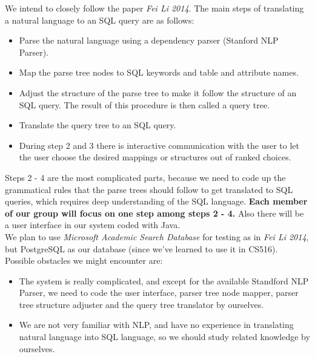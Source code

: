 \documentclass[twocolumn]{article}
\begin{document}
\begin{itemize}
	We intend to closely follow the paper \textit{Fei Li 2014}. The main steps of translating a natural language to an SQL query are as follows:\\
	\begin{itemize}
		\item Parse the natural language using a dependency parser (Stanford NLP Parser).\\
		\item Map the parse tree nodes to SQL keywords and table and attribute names.\\
		\item Adjust the structure of the parse tree to make it follow the structure of an SQL query. The result of this procedure is then called a query tree.\\
		\item Translate the query tree to an SQL query.\\
		\item During step 2 and 3 there is interactive communication with the user to let the user choose the desired mappings or structures out of ranked choices.\\				
	\end{itemize}
	Steps 2 - 4 are the most complicated parts, because we need to code up the grammatical rules that the parse trees should follow to get translated to SQL queries, which requires deep understanding of the SQL language. \textbf{Each member of our group will focus on one step among steps 2 - 4.} Also there will be a user interface in our system coded with Java.\\
	We plan to use \textit{Microsoft Academic Search Database} for testing as in \textit{Fei Li 2014}, but PostgreSQL as our database (since we've learned to use it in CS516).\\
	
	Possible obstacles we might encounter are:\\
	\begin{itemize}
		\item The system is really complicated, and except for the available Standford NLP Parser, we need to code the user interface, parser tree node mapper, parser tree structure adjuster and the query tree translator by ourselves.\\
		\item We are not very familiar with NLP, and have no experience in translating natural language into SQL language, so we should study related knowledge by ourselves.\\
	\end{itemize}
\end{itemize}
\end{document}

